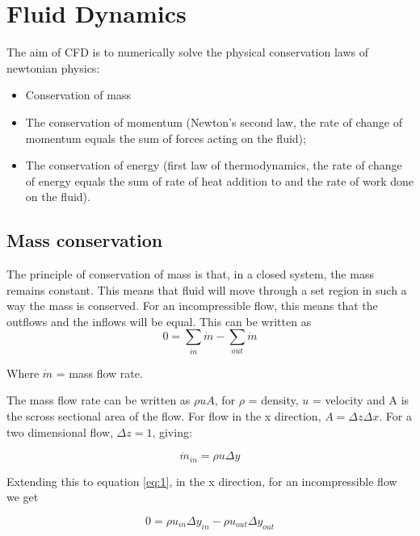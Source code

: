\section{Fluid Dynamics}
The aim of CFD is to numerically solve the physical conservation laws of newtonian physics:

\begin{itemize}
  \item Conservation of mass

  \item The conservation of momentum (Newton’s second law, the rate of change of momentum equals the sum of forces acting on the fluid);

  \item The conservation of energy (first law of thermodynamics, the rate of change of energy equals the sum of rate of heat addition to and the rate of work done on the fluid).
 
\end{itemize}

    \subsection{Mass conservation}

    The principle of conservation of mass is that, in a closed system, the mass remains constant. This means that fluid will move through a set region in such a way the mass is conserved. For an incompressible flow, this means that the outflows and the inflows will be equal. This can be written as
    \begin{equation} \label{eq:1}
      0 = \sum_{in} \dot{m} - \sum_{out} \dot{m}
    \end{equation} 

    Where $\dot{m}$ = mass flow rate.
    
    The mass flow rate can be written as $ \rho u A $,  for $\rho$ = density, $u$ = velocity and A is the scross sectional area of the flow. For flow in the x direction, $ A = \Delta z \Delta x $. For a two dimensional flow, $ \Delta z = 1 $, giving:

    \begin{equation} \label{eq:2}
      \dot{m}_{in} = \rho u \Delta y
     \end{equation}

    Extending this to equation \ref{eq:1}, in the x direction, for an incompressible flow we get

    \begin{equation} \label{eq:3}
      0 = \rho u_{in} \Delta y_{in} - \rho u_{out} \Delta y_{out}
    \end{equation}

